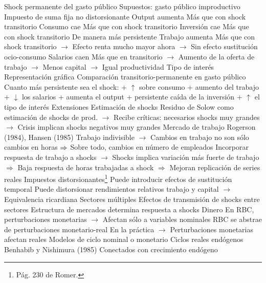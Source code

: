 \documentclass{nuevotema}
\begin{document}
\begin{esquemal}
			\3 Shock permanente del gasto público
				\4 Supuestos:
				\4[] gasto público improductivo
				\4[] Impuesto de suma fija no distorsionante
				\4 Output aumenta
				\4[] Más que con shock transitorio
				\4 Consumo cae
				\4[] Más que con shock transitorio
				\4 Inversión cae
				\4[] Más que con shock transitorio
				\4[] De manera más persistente
				\4 Trabajo aumenta
				\4[] Más que con shock transitorio
				\4[] $\to$ Efecto renta mucho mayor ahora
				\4[] $\to$ Sin efecto sustitución ocio-consumo
				\4 Salarios caen
				\4[] Más que en transitorio
				\4[] $\to$ Aumento de la oferta de trabajo
				\4[] $\to$ Menos capital
				\4[] $\to$ Igual productividad
				\4 Tipo de interés
				\4 Representación gráfica
				\4[] 
			\3 Comparación transitorio-permanente en gasto público
				\4 Cuanto más persistente sea el shock:
				\4[Consumo] + $\uparrow$ sobre consumo
				\4[Trabajo] + aumento del trabajo
				\4[Salarios] + $\downarrow$ los salarios
				\4[Output] + aumenta el output
				\4[Inversión] + persistente caída de la inversión
				 + $\uparrow$ el tipo de interés
		\2 Extensiones
			\3 Estimación de shocks
				\4[] Residuo de Solow como estimación de shocks de prod.
				\4[] $\to$ Recibe críticas: necesarios shocks muy grandes
				\4[] $\to$ Crisis implican shocks negativos muy grandes
			\3 Mercado de trabajo
				\4[] Rogerson (1984), Hansen (1985)
				\4[] Trabajo indivisible
				\4[] $\to$ Cambios en trabajo no son sólo cambios en horas
				\4[] $\Rightarrow$ Sobre todo, cambios en número de empleados
				\4[] Incorporar respuesta de trabajo a shocks
				\4[] $\to$ Shocks implica variación más fuerte de trabajo
				\4[] $\Rightarrow$ Baja respuesta de horas trabajadas a shock
				\4[] $\Rightarrow$ Mejoran replicación de series reales
			\3 Impuestos distorsionantes\footnote{Pág. 230 de Romer.}
				\4[] Puede introducir efectos de sustitución temporal
				\4[] Puede distorsionar rendimientos relativos trabajo y capital
				\4[] $\to$ Equivalencia ricardiana
			\3 Sectores múltiples
				\4[] Efectos de transmisión de shocks entre sectores
				\4[] Estructura de mercados determina respuesta a shocks
			\3 Dinero
				\4[] En RBC, perturbaciones monetarias
				\4[] $\to$ Afectan sólo a variables nominales
				\4[] RBC se abstrae de perturbaciones monetario-real
				\4[] En la práctica
				\4[] $\to$ Perturbaciones monetarias afectan reales
				\4[] Modelos de ciclo nominal o monetario
			\3 Ciclos reales endógenos
				\4[] Benhabib y Nishimura (1985)
				\4[] Conectados con crecimiento endógeno

\end{esquemal}
\end{document}
